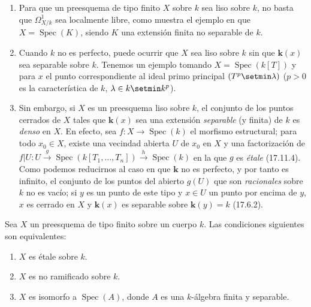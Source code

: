 \begin{remarks}[17.15.10]
\label{IV.17.15.10}
\begin{enumerate}
  \item[(i)] Para que un preesquema de tipo finito $X$ sobre $k$ sea liso sobre $k$, no basta que $\varOmega^1_{X/k}$ sea localmente libre, como muestra el ejemplo en que $X=\operatorname{Spec}(K)$, siendo $K$ una extensión finita no separable de $k$.
  \item[(ii)] Cuando $k$ no es perfecto, puede ocurrir que $X$ sea liso sobre $k$ sin que $\boldsymbol k(x)$ sea separable sobre $k$. Tenemos un ejemplo tomando $X=\operatorname{Spec}(k[T])$ y para $x$ el punto correspondiente al ideal primo principal $(T^p\setmin\lambda)$ ($p>0$ es la característica de $k$, $\lambda\in k\setmin k^p$).
  \item[(iii)] Sin embargo, si $X$ es un preesquema liso sobre $k$, el conjunto de los puntos cerrados de $X$ tales que $\boldsymbol k(x)$ sea una extensión \emph{separable} (y finita) de $k$ es \emph{denso} en $X$. En efecto, sea $f:X\to\operatorname{Spec}(k)$ el morfismo estructural; para todo $x_0\in X$, existe una vecindad abierta $U$ de $x_0$ en $X$ y una factorización de $f|U:U\xrightarrow{g}\operatorname{Spec}(k[T_1,\ldots,T_n])\xrightarrow{h}\operatorname{Spec}(k)$ en la que $g$ es \emph{étale} (17.11.4). Como podemos reducirnos al caso en que $\boldsymbol k$ no es perfecto, y por tanto es infinito, el conjunto de los puntos del abierto $g(U)$ que son \emph{racionales} sobre $k$ no es vacío; si $y$ es un punto de este tipo y $x\in U$ un punto por encima de $y$, $x$ es cerrado en $X$ y $\boldsymbol k(x)$ es separable sobre $\boldsymbol k(y)=k$ (17.6.2).
\end{enumerate}
\end{remarks}

\begin{proposition}[17.15.11]
\label{IV.17.15.11}
Sea $X$ un preesquema de tipo finito sobre un cuerpo $k$. Las condiciones siguientes son equivalentes:
\begin{enumerate}
  \item[\textup{a)}] $X$ es étale sobre $k$.
  \item[\textup{b)}] $X$ es no ramificado sobre $k$.
  \item[\textup{c)}] $X$ es isomorfo a $\operatorname{Spec}(A)$, donde $A$ es una $k$-álgebra finita y separable.
\end{enumerate}
\end{proposition}

